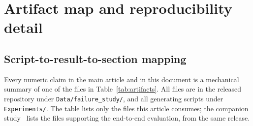 \documentclass[final,5p,times,longtitle]{elsarticle}
\theoremstyle{plain}
\begin{document}
\section{Artifact map and reproducibility detail}
\label{si:artifacts}

\subsection{Script-to-result-to-section mapping}

Every numeric claim in the main article and in this document is a
mechanical summary of one of the files in Table~\ref{tab:artifacts}. All
files are in the released repository under
\texttt{Data/failure\_study/}, and all generating scripts under
\texttt{Experiments/}. The table lists only the files this article
consumes; the companion study~\cite{companion} lists the files supporting
the end-to-end evaluation, from the same release.
\end{document}
